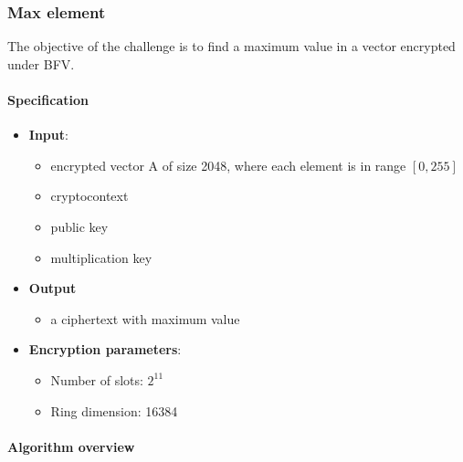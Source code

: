 \documentclass[article]{iacrtrans}
\begin{document}
    


    \subsubsection{Max element}
The objective of the challenge is to find a maximum value in a vector encrypted under BFV.

\paragraph{Specification}
 \begin{itemize}
    \item \textbf{Input}: 
        \begin{itemize}
            \item encrypted vector A of size  2048, where each element is in range $[0, 255]$
            \item cryptocontext
            \item public key
            \item multiplication key
        \end{itemize}
    \item \textbf{Output}
        \begin{itemize}
            \item a ciphertext with maximum value
        \end{itemize}
    \item \textbf{Encryption parameters}:
        \begin{itemize}
            \item Number of slots: $2^{11}$ 
            \item Ring dimension: 16384
        \end{itemize}
\end{itemize}

     
\paragraph{Algorithm overview}\mbox{}\\
\end{document}

